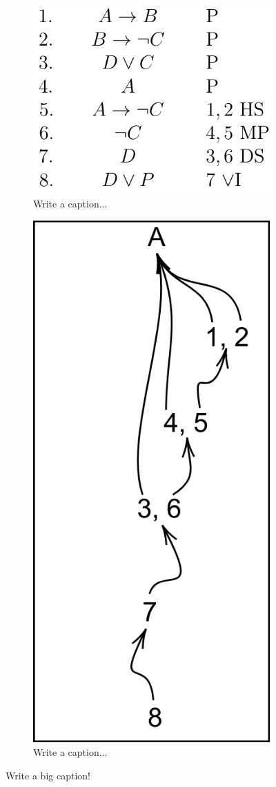 \documentclass[ms]{uncgdissertationexp2}
\theoremstyle{plain}
\theoremstyle{definition}
\theoremstyle{remark}
\begin{document}
\begin{figure}[!ht]
	\centering
	\begin{subfigure}{.5\textwidth}
		\centering
		\includegraphics[width=.9\textwidth]{algorithmexample.png}
		\caption{Write a caption...}
		\label{fig:algorithmexample}
	\end{subfigure}%
	\begin{subfigure}{.5\textwidth}
		\centering
		\includegraphics[width=.35\textwidth]{algorithmpath.png}
		\caption{Write a caption...}
		\label{fig:algorithmpath}
	\end{subfigure}
	\caption{Write a big caption!}
	\label{fig:togetheralgorithm}
\end{figure}
\end{document}
